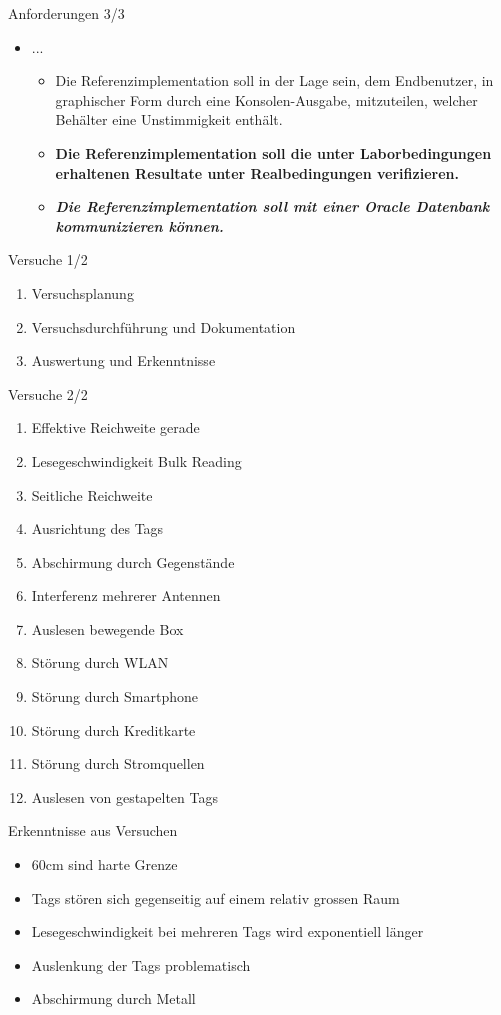 \documentclass{beamer}
\begin{document}
\begin{frame}{Anforderungen 3/3}
\begin{itemize}
    \item ...
    \begin{itemize}
        \item Die Referenzimplementation soll in der Lage sein, dem Endbenutzer, in graphischer Form durch eine Konsolen-Ausgabe, mitzuteilen, welcher Behälter eine Unstimmigkeit enthält.
        \item \textbf{Die Referenzimplementation soll die unter Laborbedingungen erhaltenen Resultate unter Realbedingungen verifizieren.}
        \item \textbf{\textit{Die Referenzimplementation soll mit einer Oracle Datenbank kommunizieren können.}}
    \end{itemize}
 \end{itemize}
\end{frame}
\begin{frame}{Versuche 1/2}
\begin{enumerate}
    \item Versuchsplanung
    \item Versuchsdurchführung und Dokumentation
    \item Auswertung und Erkenntnisse
\end{enumerate}
\end{frame}
\begin{frame}{Versuche 2/2}
\begin{enumerate}
    \item Effektive Reichweite gerade
    \item Lesegeschwindigkeit Bulk Reading
    \item Seitliche Reichweite
    \item Ausrichtung des Tags
    \item Abschirmung durch Gegenstände
    \item Interferenz mehrerer Antennen
    \item Auslesen bewegende Box
    \item Störung durch WLAN
    \item Störung durch Smartphone
    \item Störung durch Kreditkarte
    \item Störung durch Stromquellen
    \item Auslesen von gestapelten Tags
\end{enumerate}
\end{frame}
\begin{frame}{Erkenntnisse aus Versuchen}
\begin{itemize}
    \item 60cm sind harte Grenze
    \item Tags stören sich gegenseitig auf einem relativ grossen Raum
    \item Lesegeschwindigkeit bei mehreren Tags wird exponentiell länger
    \item Auslenkung der Tags problematisch
    \item Abschirmung durch Metall
\end{itemize}
\end{frame}
\end{document}
